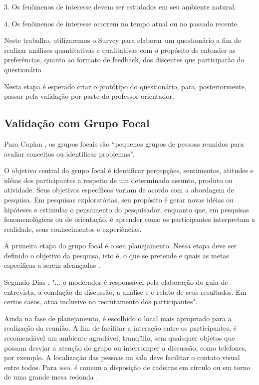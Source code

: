 3. Os fenômenos de interesse devem ser estudados em seu ambiente natural.

4. Os fenômenos de interesse ocorrem no tempo atual ou no passado recente.

Neste trabalho, utilizaremos o Survey para elaborar um questionário a fim de realizar análises quantitativas e qualitativas com o propósito de entender as preferências, quanto ao formato de feedback, dos discentes que participarão do questionário.

Nesta etapa é esperado criar o protótipo do questionário, para, posteriormente, passar pela validação por parte do professor orientador.

\subsection{Validação com Grupo Focal}

Para Caplan \cite{caplan1990using}, os grupos focais são “pequenos grupos de pessoas reunidos para avaliar conceitos ou identificar problemas”.

O objetivo central do grupo focal é identificar percepções, sentimentos, atitudes e
idéias dos participantes a respeito de um determinado assunto, produto ou atividade. Seus
objetivos específicos variam de acordo com a abordagem de pesquisa. Em pesquisas
exploratórias, seu propósito é gerar novas idéias ou hipóteses e estimular o pensamento do
pesquisador, enquanto que, em pesquisas fenomenológicas ou de orientação, é aprender
como os participantes interpretam a realidade, seus conhecimentos e experiências.\cite{dias2000grupo}

A primeira etapa do grupo focal é o seu planejamento. Nessa etapa deve ser
definido o objetivo da pesquisa, isto é, o que se pretende e quais as metas específicas a
serem alcançadas \cite{dias2000grupo}.

Segundo Dias \cite{dias2000grupo}, "... o moderador é responsável pela elaboração do guia de entrevista, a condução da discussão, a análise e o relato de seus resultados. Em certos casos, atua inclusive no recrutamento dos participantes".

Ainda na fase de planejamento, é escolhido o local mais apropriado para a
realização da reunião. A fim de facilitar a interação entre os participantes, é recomendável
um ambiente agradável, tranqüilo, sem quaisquer objetos que possam desviar a atenção do
grupo ou interromper a discussão, como telefones, por exemplo. A localização das pessoas
na sala deve facilitar o contato visual entre todos. Para isso, é comum a disposição de
cadeiras em círculo ou em torno de uma grande mesa redonda \cite{dias2000grupo}.

